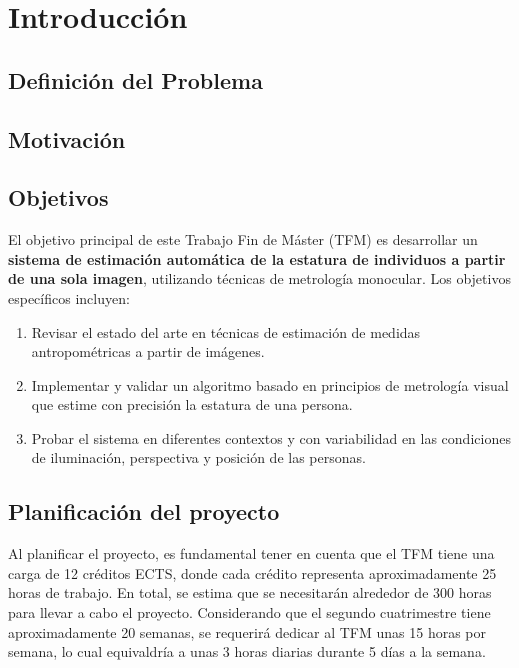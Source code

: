 \chapter{Introducción}
\section{Definición del Problema}   
\section{Motivación}
\section{Objetivos}
El objetivo principal de este Trabajo Fin de Máster (TFM) es desarrollar 
un \textbf{sistema de estimación automática de la estatura de individuos a partir de una sola imagen}, 
utilizando técnicas de metrología monocular. Los objetivos específicos incluyen:
\begin{enumerate}
    \item Revisar el estado del arte en técnicas de estimación de medidas antropométricas a partir de imágenes.
    \item Implementar y validar un algoritmo basado en principios de metrología visual que estime con precisión la estatura de una persona.
    \item Probar el sistema en diferentes contextos y con variabilidad en las condiciones de iluminación, perspectiva y posición de las personas.
\end{enumerate}
\section{Planificación del proyecto}
Al planificar el proyecto, es fundamental tener en cuenta que el TFM 
tiene una carga de 12 créditos ECTS, donde cada 
crédito representa aproximadamente 25 horas de trabajo. 
En total, se estima que se necesitarán alrededor de 300 horas para llevar a cabo 
el proyecto.  Considerando que el segundo cuatrimestre tiene aproximadamente 20 semanas, 
se requerirá dedicar al TFM unas 15 horas por semana, lo cual equivaldría a unas 3 horas 
diarias durante 5 días a la semana.

